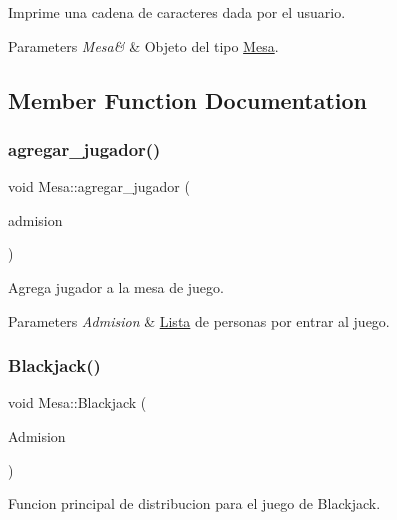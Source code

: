 Imprime una cadena de caracteres dada por el usuario. 


\begin{DoxyParams}{Parameters}
{\em Mesa\&} & Objeto del tipo \hyperlink{class_mesa}{Mesa}. \\
\hline
\end{DoxyParams}


\subsection{Member Function Documentation}
\hypertarget{class_mesa_ad8160d20365c5d6e8434e2ebd2c75b06}{}\label{class_mesa_ad8160d20365c5d6e8434e2ebd2c75b06} 
\subsubsection{\texorpdfstring{agregar\+\_\+jugador()}{agregar\_jugador()}}
{\ttfamily void Mesa\+::agregar\+\_\+jugador (\begin{DoxyParamCaption}\item[{\hyperlink{class_lista_con_arreglo}{Lista\+Con\+Arreglo}$<$ char $>$ $\ast$}]{admision }\end{DoxyParamCaption})}



Agrega jugador a la mesa de juego. 


\begin{DoxyParams}{Parameters}
{\em Admision} & \hyperlink{class_lista}{Lista} de personas por entrar al juego. \\
\hline
\end{DoxyParams}
\hypertarget{class_mesa_a567e239c0dedc7d2aadb0633b4f1580b}{}\label{class_mesa_a567e239c0dedc7d2aadb0633b4f1580b} 
\subsubsection{\texorpdfstring{Blackjack()}{Blackjack()}}
{\ttfamily void Mesa\+::\+Blackjack (\begin{DoxyParamCaption}\item[{\hyperlink{class_lista_con_arreglo}{Lista\+Con\+Arreglo}$<$ char $>$ $\ast$}]{Admision }\end{DoxyParamCaption})}



Funcion principal de distribucion para el juego de Blackjack. 


